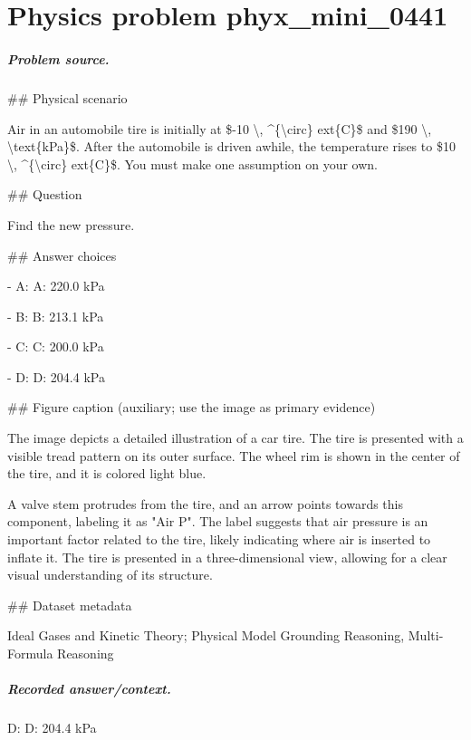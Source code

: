 
\chapter{Physics problem phyx\_mini\_0441}
\label{ch:PhyXMiniProblems_problem_phyx_mini_0441}

\paragraph{Problem source.}
\#\# Physical scenario

Air in an automobile tire is initially at \$-10 \textbackslash{}, \textasciicircum{}\{\textbackslash{}circ\}	ext\{C\}\$ and \$190 \textbackslash{}, \textbackslash{}text\{kPa\}\$. After the automobile is driven awhile, the temperature rises to \$10 \textbackslash{}, \textasciicircum{}\{\textbackslash{}circ\}	ext\{C\}\$. You must make one assumption on your own.

\#\# Question

Find the new pressure.

\#\# Answer choices

- A: A: 220.0 kPa

- B: B: 213.1 kPa

- C: C: 200.0 kPa

- D: D: 204.4 kPa

\#\# Figure caption (auxiliary; use the image as primary evidence)

The image depicts a detailed illustration of a car tire. The tire is presented with a visible tread pattern on its outer surface. The wheel rim is shown in the center of the tire, and it is colored light blue.

A valve stem protrudes from the tire, and an arrow points towards this component, labeling it as "Air P". The label suggests that air pressure is an important factor related to the tire, likely indicating where air is inserted to inflate it. The tire is presented in a three-dimensional view, allowing for a clear visual understanding of its structure.

\#\# Dataset metadata

Ideal Gases and Kinetic Theory; Physical Model Grounding Reasoning, Multi-Formula Reasoning

\paragraph{Recorded answer/context.}
D: D: 204.4 kPa


